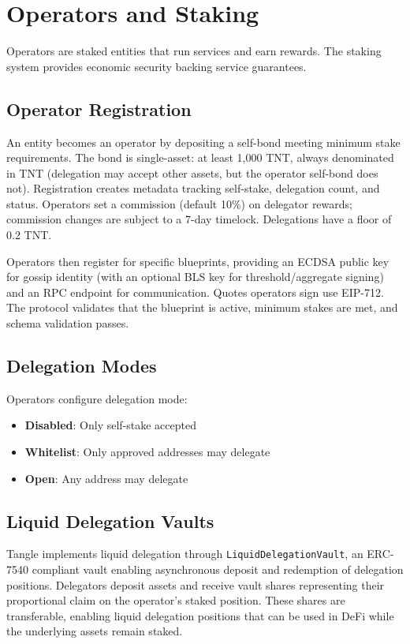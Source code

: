 \documentclass[11pt,a4paper]{article}
\begin{document}
\section{Operators and Staking}

Operators are staked entities that run services and earn rewards. The staking system provides economic security backing service guarantees.

\subsection{Operator Registration}

An entity becomes an operator by depositing a self-bond meeting minimum stake requirements. The bond is single-asset: at least 1{,}000 TNT, always denominated in TNT (delegation may accept other assets, but the operator self-bond does not). Registration creates metadata tracking self-stake, delegation count, and status. Operators set a commission (default 10\%) on delegator rewards; commission changes are subject to a 7-day timelock. Delegations have a floor of 0.2 TNT.

Operators then register for specific blueprints, providing an ECDSA public key for gossip identity (with an optional BLS key for threshold/aggregate signing) and an RPC endpoint for communication. Quotes operators sign use EIP-712. The protocol validates that the blueprint is active, minimum stakes are met, and schema validation passes.

\subsection{Delegation Modes}

Operators configure delegation mode:
\begin{itemize}[noitemsep]
    \item \textbf{Disabled}: Only self-stake accepted
    \item \textbf{Whitelist}: Only approved addresses may delegate
    \item \textbf{Open}: Any address may delegate
\end{itemize}

\subsection{Liquid Delegation Vaults}

Tangle implements liquid delegation through \texttt{LiquidDelegationVault}, an ERC-7540 compliant vault enabling asynchronous deposit and redemption of delegation positions. Delegators deposit assets and receive vault shares representing their proportional claim on the operator's staked position. These shares are transferable, enabling liquid delegation positions that can be used in DeFi while the underlying assets remain staked.
\end{document}
